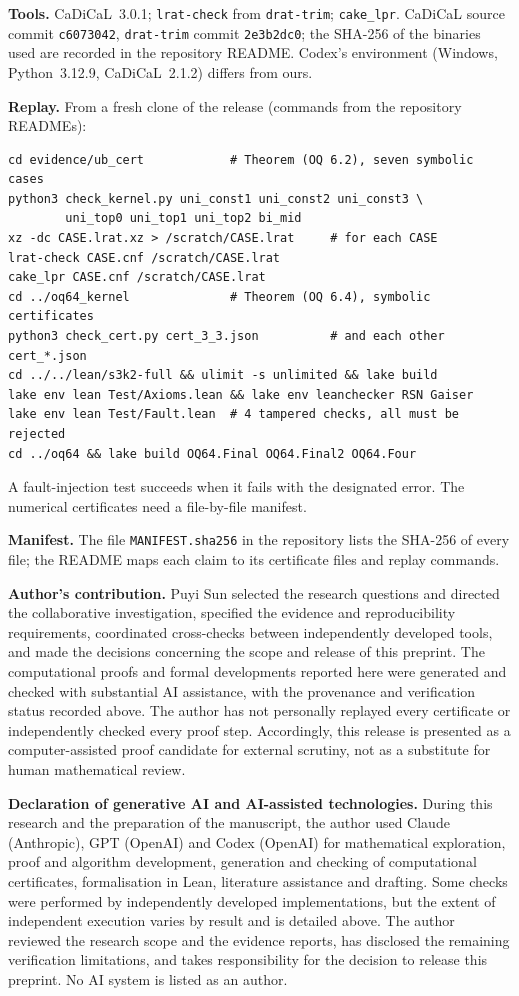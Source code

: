 \documentclass[11pt]{amsart}
\theoremstyle{definition}
\begin{document}
\smallskip\noindent\textbf{Tools.} CaDiCaL~3.0.1; \texttt{lrat-check} from \texttt{drat-trim}; \texttt{cake\_lpr}. CaDiCaL source commit \texttt{c6073042}, \texttt{drat-trim} commit \texttt{2e3b2dc0}; the SHA-256 of the binaries used are recorded in the repository README. Codex's environment (Windows, Python~3.12.9, CaDiCaL~2.1.2) differs from ours.


\smallskip\noindent\textbf{Replay.} From a fresh clone of the release (commands from the repository READMEs):
\begin{verbatim}
cd evidence/ub_cert            # Theorem (OQ 6.2), seven symbolic cases
python3 check_kernel.py uni_const1 uni_const2 uni_const3 \
        uni_top0 uni_top1 uni_top2 bi_mid
xz -dc CASE.lrat.xz > /scratch/CASE.lrat     # for each CASE
lrat-check CASE.cnf /scratch/CASE.lrat
cake_lpr CASE.cnf /scratch/CASE.lrat
cd ../oq64_kernel              # Theorem (OQ 6.4), symbolic certificates
python3 check_cert.py cert_3_3.json          # and each other cert_*.json
cd ../../lean/s3k2-full && ulimit -s unlimited && lake build
lake env lean Test/Axioms.lean && lake env leanchecker RSN Gaiser
lake env lean Test/Fault.lean  # 4 tampered checks, all must be rejected
cd ../oq64 && lake build OQ64.Final OQ64.Final2 OQ64.Four
\end{verbatim}
A fault-injection test succeeds when it fails with the designated error. The numerical certificates need a file-by-file manifest.


\smallskip\noindent\textbf{Manifest.} The file \texttt{MANIFEST.sha256} in the repository lists the SHA-256 of every file; the README maps each claim to its certificate files and replay commands.


\smallskip\noindent\textbf{Author's contribution.} Puyi Sun selected the research questions and directed the collaborative investigation, specified the evidence and reproducibility requirements, coordinated cross-checks between independently developed tools, and made the decisions concerning the scope and release of this preprint. The computational proofs and formal developments reported here were generated and checked with substantial AI assistance, with the provenance and verification status recorded above. The author has not personally replayed every certificate or independently checked every proof step. Accordingly, this release is presented as a computer-assisted proof candidate for external scrutiny, not as a substitute for human mathematical review.


\smallskip\noindent\textbf{Declaration of generative AI and AI-assisted technologies.} During this research and the preparation of the manuscript, the author used Claude (Anthropic), GPT (OpenAI) and Codex (OpenAI) for mathematical exploration, proof and algorithm development, generation and checking of computational certificates, formalisation in Lean, literature assistance and drafting. Some checks were performed by independently developed implementations, but the extent of independent execution varies by result and is detailed above. The author reviewed the research scope and the evidence reports, has disclosed the remaining verification limitations, and takes responsibility for the decision to release this preprint. No AI system is listed as an author.
\end{document}
